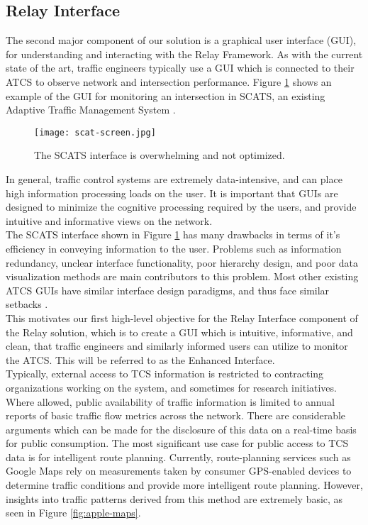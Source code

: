 \documentclass{article}
\begin{document}
\subsection{Relay Interface}
The second major component of our solution is a graphical user interface (GUI), for understanding and interacting with the Relay Framework.
As with the current state of the art, traffic engineers typically use a GUI which is connected to their ATCS to observe network and intersection performance.
Figure \ref{fig:scats-screenshot} shows an example of the GUI for monitoring an intersection in SCATS, an existing Adaptive Traffic Management System \cite{scats}.\\

\begin{figure}[htbp!]
  \begin{centering}
    \texttt{[image: scat-screen.jpg]}
    \caption{The SCATS interface is overwhelming and not optimized.}
    \label{fig:scats-screenshot}
  \end{centering}
\end{figure}

In general, traffic control systems are extremely data-intensive, and can place high information processing loads on the user.
It is important that GUIs are designed to minimize the cognitive processing required by the users, and provide intuitive and informative views on the network.\\

The SCATS interface shown in Figure \ref{fig:scats-screenshot} has many drawbacks in terms of it's efficiency in conveying information to the user.
Problems such as information redundancy, unclear interface functionality, poor hierarchy design, and poor data visualization methods are main contributors to this problem.
Most other existing ATCS GUIs have similar interface design paradigms, and thus face similar setbacks \cite{la-atcs-brochure}.\\

This motivates our first high-level objective for the Relay Interface component of the Relay solution, which is to create a GUI which is intuitive, informative, and clean, that traffic engineers and similarly informed users can utilize to monitor the ATCS.
This will be referred to as the Enhanced Interface.\\

Typically, external access to TCS information is restricted to contracting organizations working on the system, and sometimes for research initiatives.
Where allowed, public availability of traffic information is limited to annual reports of basic traffic flow metrics across the network.
There are considerable arguments which can be made for the disclosure of this data on a real-time basis for public consumption.
The most significant use case for public access to TCS data is for intelligent route planning.
Currently, route-planning services such as Google Maps rely on measurements taken by consumer GPS-enabled devices to determine traffic conditions and provide more intelligent route planning.
However, insights into traffic patterns derived from this method are extremely basic, as seen in Figure \ref{fig:apple-maps}.\\
\end{document}
